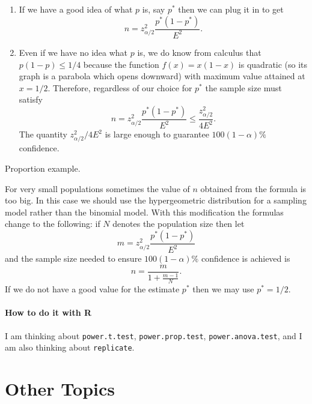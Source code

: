 \documentclass[captions=tableheading]{scrbook}
\begin{document}
\begin{enumerate}
\item If we have a good idea of what \(p\) is, say \(p^{\ast}\) then we can plug it in to get
   \begin{equation}
   n=z_{\alpha/2}^{2}\frac{p^{\ast}(1-p^{\ast})}{E^{2}}.
   \end{equation}
\item Even if we have no idea what \(p\) is, we do know from calculus that \(p(1-p)\leq1/4\) because the function \(f(x)=x(1-x)\) is quadratic (so its graph is a parabola which opens downward) with maximum value attained at \(x=1/2\). Therefore, regardless of our choice for \(p^{\ast}\) the sample size must satisfy
   \begin{equation}
   n=z_{\alpha/2}^{2}\frac{p^{\ast}(1-p^{\ast})}{E^{2}}\leq\frac{z_{\alpha/2}^{2}}{4E^{2}}.
   \end{equation}
   The quantity \(z_{\alpha/2}^{2}/4E^{2}\) is large enough to guarantee \(100(1-\alpha)\%\) confidence.
\end{enumerate}

\begin{example}
Proportion example.
\end{example}

\begin{rem}
For very small populations sometimes the value of \(n\) obtained from the formula is too big. In this case we should use the hypergeometric distribution for a sampling model rather than the binomial model. With this modification the formulas change to the following: if \(N\) denotes the population size then let
\begin{equation}
m=z_{\alpha/2}^{2}\frac{p^{\ast}(1-p^{\ast})}{E^{2}}
\end{equation}
and the sample size needed to ensure \(100(1-\alpha)\%\) confidence is achieved is
\begin{equation}
n=\frac{m}{1+\frac{m-1}{N}}.
\end{equation}
If we do not have a good value for the estimate \(p^{\ast}\) then we may use \(p^{\ast}=1/2\).
\end{rem}


\paragraph*{How to do it with \textsf{R}}
I am thinking about \texttt{power.t.test}, \texttt{power.prop.test}, \texttt{power.anova.test}, and I am also thinking about \texttt{replicate}.
\section{Other Topics}
\label{sec-9-8}
\end{document}
